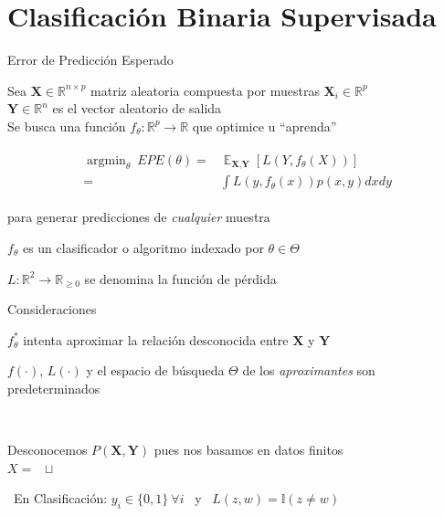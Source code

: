 \documentclass[xcolor=x11names]{beamer}
\DeclareMathOperator{\Expect}{\mathbb{E}}
\DeclareMathOperator{\trainsetn}{\mathcal{T}^{(n)}}
\DeclareMathOperator{\testsetn}{\mathcal{T_s}^{(n)}}
\begin{document}
\section{Clasificación Binaria Supervisada}

\begin{frame}{Error de Predicción Esperado}
		\centering

		Sea $\textbf{X} \in \mathbb{R}^{n \times p}$ matriz aleatoria compuesta por muestras $\textbf{X}_i \in \mathbb{R}^{p}$\\
		$\textbf{Y} \in \mathbb{R}^n$ es el vector aleatorio de salida \\
		Se busca una función $f_\theta: \mathbb{R}^{p} \rightarrow  \mathbb{R}$ que optimice u ``aprenda''

	\begin{align*}%
		\begin{split}
		\operatorname{argmin}_{\theta} \  EPE(\theta) = & \Expect_{\textbf{X},\textbf{Y}} \left[ L(Y,f_\theta(X))\right]  \\
			= & \int L(y,f_\theta (x)) p(x,y) dx dy
		\end{split}
	\end{align*}

	para generar predicciones de \textit{cualquier} muestra

	\smallskip
	$f_\theta$ es un clasificador o algoritmo indexado por $\theta \in \Theta$

	\smallskip
	$L: \mathbb{R}^{2} \rightarrow  \mathbb{R}_{\geq 0}$ se denomina la función de pérdida


\end{frame}

\begin{frame}{Consideraciones}

	$f_\theta^*$ intenta aproximar la relación desconocida entre $\textbf{X}$ y $\textbf{Y}$

	\bigskip

	$f(\cdot)$, $L(\cdot)$ y el espacio de búsqueda $\Theta$ de los \textit{aproximantes} son predeterminados

	\bigskip\

	Desconocemos $P(\textbf{X},\textbf{Y})$ pues nos basamos en datos finitos\\

	$X = \trainsetn  \sqcup \testsetn $

	\bigskip\
	En Clasificación: $y_i \in \{0,1\} \ \forall  i$ \ y \ $L(z,w) =  \mathbb{I}(z \neq w ) $

\end{frame}
\end{document}
